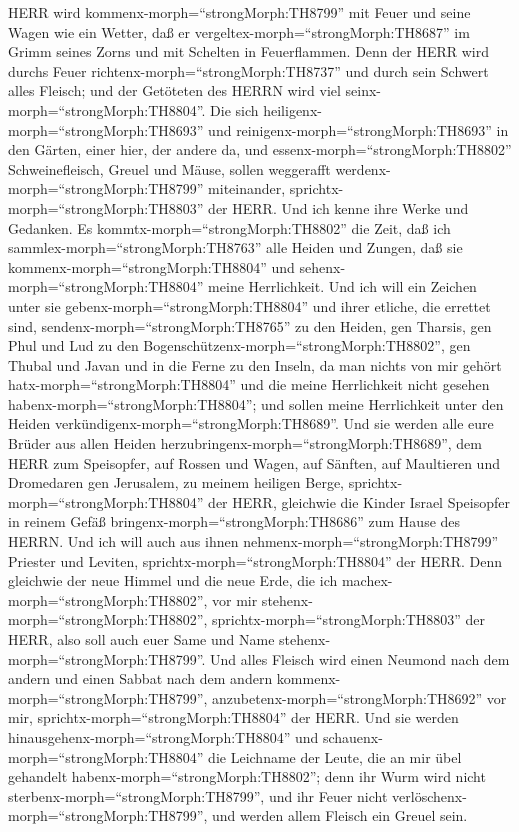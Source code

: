 HERR wird kommenx-morph=``strongMorph:TH8799'' mit Feuer und seine Wagen
wie ein Wetter, daß er vergeltex-morph=``strongMorph:TH8687'' im Grimm
seines Zorns und mit Schelten in Feuerflammen.  Denn der
HERR wird durchs Feuer richtenx-morph=``strongMorph:TH8737'' und durch
sein Schwert alles Fleisch; und der Getöteten des HERRN wird viel
seinx-morph=``strongMorph:TH8804''.  Die sich
heiligenx-morph=``strongMorph:TH8693'' und
reinigenx-morph=``strongMorph:TH8693'' in den Gärten, einer hier, der
andere da, und essenx-morph=``strongMorph:TH8802'' Schweinefleisch,
Greuel und Mäuse, sollen weggerafft werdenx-morph=``strongMorph:TH8799''
miteinander, sprichtx-morph=``strongMorph:TH8803'' der HERR.
 Und ich kenne ihre Werke und Gedanken. Es
kommtx-morph=``strongMorph:TH8802'' die Zeit, daß ich
sammlex-morph=``strongMorph:TH8763'' alle Heiden und Zungen, daß sie
kommenx-morph=``strongMorph:TH8804'' und
sehenx-morph=``strongMorph:TH8804'' meine Herrlichkeit. 
Und ich will ein Zeichen unter sie gebenx-morph=``strongMorph:TH8804''
und ihrer etliche, die errettet sind,
sendenx-morph=``strongMorph:TH8765'' zu den Heiden, gen Tharsis, gen
Phul und Lud zu den Bogenschützenx-morph=``strongMorph:TH8802'', gen
Thubal und Javan und in die Ferne zu den Inseln, da man nichts von mir
gehört hatx-morph=``strongMorph:TH8804'' und die meine Herrlichkeit
nicht gesehen habenx-morph=``strongMorph:TH8804''; und sollen meine
Herrlichkeit unter den Heiden verkündigenx-morph=``strongMorph:TH8689''.
 Und sie werden alle eure Brüder aus allen Heiden
herzubringenx-morph=``strongMorph:TH8689'', dem HERR zum Speisopfer, auf
Rossen und Wagen, auf Sänften, auf Maultieren und Dromedaren gen
Jerusalem, zu meinem heiligen Berge,
sprichtx-morph=``strongMorph:TH8804'' der HERR, gleichwie die Kinder
Israel Speisopfer in reinem Gefäß bringenx-morph=``strongMorph:TH8686''
zum Hause des HERRN.  Und ich will auch aus ihnen
nehmenx-morph=``strongMorph:TH8799'' Priester und Leviten,
sprichtx-morph=``strongMorph:TH8804'' der HERR.  Denn
gleichwie der neue Himmel und die neue Erde, die ich
machex-morph=``strongMorph:TH8802'', vor mir
stehenx-morph=``strongMorph:TH8802'',
sprichtx-morph=``strongMorph:TH8803'' der HERR, also soll auch euer Same
und Name stehenx-morph=``strongMorph:TH8799''.  Und alles
Fleisch wird einen Neumond nach dem andern und einen Sabbat nach dem
andern kommenx-morph=``strongMorph:TH8799'',
anzubetenx-morph=``strongMorph:TH8692'' vor mir,
sprichtx-morph=``strongMorph:TH8804'' der HERR.  Und sie
werden hinausgehenx-morph=``strongMorph:TH8804'' und
schauenx-morph=``strongMorph:TH8804'' die Leichname der Leute, die an
mir übel gehandelt habenx-morph=``strongMorph:TH8802''; denn ihr Wurm
wird nicht sterbenx-morph=``strongMorph:TH8799'', und ihr Feuer nicht
verlöschenx-morph=``strongMorph:TH8799'', und werden allem Fleisch ein
Greuel sein.
